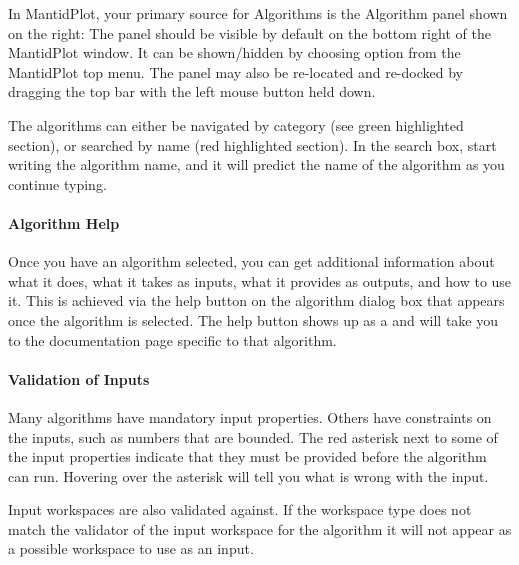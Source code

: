 \documentclass[letterpaper,10pt,english,openany]{sphinxmanual}
\let\sphinxpxdimen\pdfpxdimen\else\newdimen\sphinxpxdimen
\begin{document}
In MantidPlot, your primary source for Algorithms is the Algorithm panel
shown on the right: The panel should be visible by default on the bottom
right of the MantidPlot window. It can be shown/hidden by choosing
 option from the MantidPlot top menu. The panel
may also be re-located and re-docked by dragging the top bar with the
left mouse button held down.

\begin{DUlineblock}{0em}
\item[] The algorithms can either be navigated by category (see green
highlighted section), or searched by name (red highlighted section).
In the search box, start writing the algorithm name, and it will
predict the name of the algorithm as you continue typing.
\item[] \sphinxincludegraphics[width=300\sphinxpxdimen]{{MBC_AlgorithmDialog}.png}
\end{DUlineblock}


\paragraph{Algorithm Help}
\label{\detokenize{mantid_basic_course/algorithms_workspaces_and_histories/02_algorithms:algorithm-help}}
Once you have an algorithm selected, you can get additional information
about what it does, what it takes as inputs, what it provides as
outputs, and how to use it. This is achieved via the help button on the
algorithm dialog box that appears once the algorithm is selected. The
help button shows up as a  and will take you to the documentation
page specific to that algorithm.


\paragraph{Validation of Inputs}
\label{\detokenize{mantid_basic_course/algorithms_workspaces_and_histories/02_algorithms:validation-of-inputs}}
Many algorithms have mandatory input properties. Others have constraints
on the inputs, such as numbers that are bounded. The red asterisk next
to some of the input properties indicate that they must be provided
before the algorithm can run. Hovering over the asterisk will tell you
what is wrong with the input.

Input workspaces are also validated against. If the workspace type does
not match the validator of the input workspace for the algorithm it will
not appear as a possible workspace to use as an input.
\end{document}

